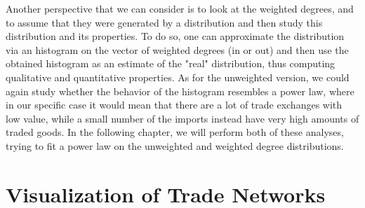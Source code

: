 Another perspective that we can consider is to look at the weighted degrees, and to assume that they were generated by a distribution and then study this distribution and its properties. To do so, one can approximate the distribution via an histogram on the vector of weighted degrees (in or out) and then use the obtained histogram as an estimate of the "real" distribution, thus computing qualitative and quantitative properties. As for the unweighted version, we could again study whether the behavior of the histogram resembles a power law, where in our specific case it would mean that there are a lot of trade exchanges with low value, while a small number of the imports instead have very high amounts of traded goods. In the following chapter, we will perform both of these analyses, trying to fit a power law on the unweighted and weighted degree distributions.



\pagebreak
\section{Visualization of Trade Networks}

